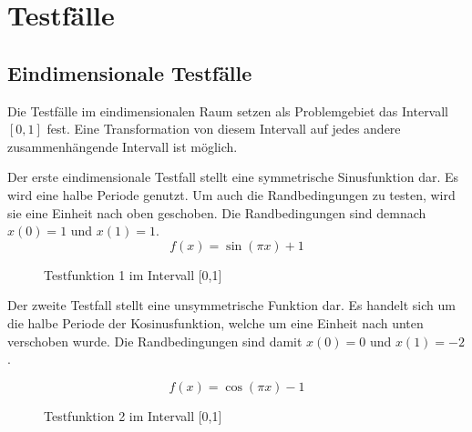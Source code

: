 \section{Testfälle}
\subsection{Eindimensionale Testfälle}

Die Testfälle im eindimensionalen Raum setzen als Problemgebiet das
Intervall $[0,1]$ fest. Eine Transformation von diesem Intervall auf jedes 
andere zusammenhängende Intervall ist möglich.

Der erste eindimensionale Testfall stellt eine symmetrische Sinusfunktion
dar. Es wird eine halbe Periode genutzt. Um auch die Randbedingungen zu testen,
wird sie eine Einheit nach oben geschoben. Die Randbedingungen sind demnach
$x(0) =1$ und $x(1)=1$.
\begin{equation}
f(x) = \sin(\pi x)+1
\end{equation}
\begin{figure}[h]
\centering
\caption{Testfunktion 1 im Intervall [0,1]}
\label{fig:testfn1}
\end{figure}


\noindent
Der zweite Testfall stellt eine unsymmetrische Funktion dar. Es handelt sich um
die halbe Periode der Kosinusfunktion, welche um eine Einheit nach unten verschoben wurde.
Die Randbedingungen sind damit
$x(0) =0$ und $x(1)=-2$.

\begin{equation}
f(x) = \cos(\pi x) -1
\end{equation}
\begin{figure}[h]
\centering
\caption{Testfunktion 2 im Intervall [0,1]}
\label{fig:testfn2}
\end{figure}

